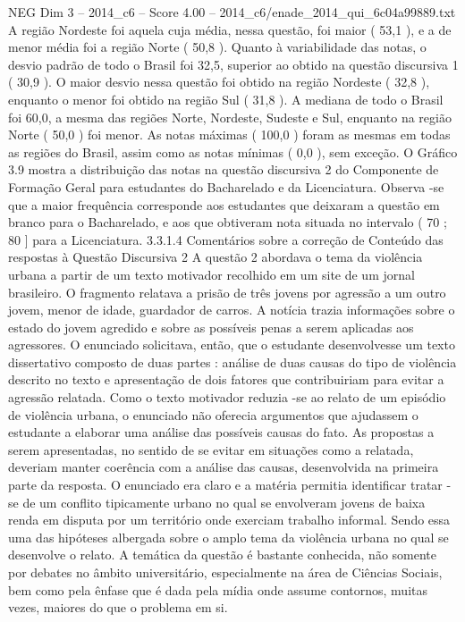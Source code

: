 \begin{textsample}{NEG Dim 3 – 2014\_c6 – Score 4.00 – 2014\_c6/enade\_2014\_qui\_6c04a99889.txt}
A região Nordeste foi aquela cuja média, nessa questão, foi maior ( 53,1 ), e a de menor média foi a região Norte ( 50,8 ).
Quanto à variabilidade das notas, o desvio padrão de todo o Brasil foi 32,5, superior ao obtido na questão discursiva 1 ( 30,9 ).
O maior desvio nessa questão foi obtido na região Nordeste ( 32,8 ), enquanto o menor foi obtido na região Sul ( 31,8 ).
A mediana de todo o Brasil foi 60,0, a mesma das regiões Norte, Nordeste, Sudeste e Sul, enquanto na região Norte ( 50,0 ) foi menor.
As notas máximas ( 100,0 ) foram as mesmas em todas as regiões do Brasil, assim como as notas mínimas ( 0,0 ), sem exceção.
O Gráfico 3.9 mostra a distribuição das notas na questão discursiva 2 do Componente de Formação Geral para estudantes do Bacharelado e da Licenciatura.
Observa -se que a maior frequência corresponde aos estudantes que deixaram a questão em branco para o Bacharelado, e aos que obtiveram nota situada no intervalo ( 70 ; 80 ] para a Licenciatura. 3.3.1.4 Comentários sobre a correção de Conteúdo das respostas à Questão Discursiva 2 A questão 2 abordava o tema da violência urbana a partir de um texto motivador recolhido em um site de um jornal brasileiro.
O fragmento relatava a prisão de três jovens por agressão a um outro jovem, menor de idade, guardador de carros.
A notícia trazia informações sobre o estado do jovem agredido e sobre as possíveis penas a serem aplicadas aos agressores.
O enunciado solicitava, então, que o estudante desenvolvesse um texto dissertativo composto de duas partes : análise de duas causas do tipo de violência descrito no texto e apresentação de dois fatores que contribuiriam para evitar a agressão relatada.
Como o texto motivador reduzia -se ao relato de um episódio de violência urbana, o enunciado não oferecia argumentos que ajudassem o estudante a elaborar uma análise das possíveis causas do fato.
As propostas a serem apresentadas, no sentido de se evitar em situações como a relatada, deveriam manter coerência com a análise das causas, desenvolvida na primeira parte da resposta.
O enunciado era claro e a matéria permitia identificar tratar -se de um conflito tipicamente urbano no qual se envolveram jovens de baixa renda em disputa por um território onde exerciam trabalho informal.
Sendo essa uma das hipóteses albergada sobre o amplo tema da violência urbana no qual se desenvolve o relato.
A temática da questão é bastante conhecida, não somente por debates no âmbito universitário, especialmente na área de Ciências Sociais, bem como pela ênfase que é dada pela mídia onde assume contornos, muitas vezes, maiores do que o problema em si.

\end{textsample}
